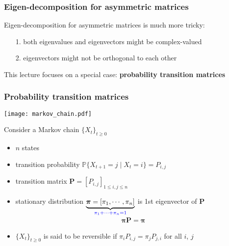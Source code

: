 \documentclass[compress,
mathserif,wide,%
]{beamer}
\begin{document}
\begin{frame}
	\frametitle{Eigen-decomposition for  asymmetric matrices}

	Eigen-decomposition for asymmetric matrices is much more tricky: 
	\begin{itemize}
		\itemsep0.5em
		\item[{\color{black}1.}]  both eigenvalues and eigenvectors might be complex-valued
		\item[{\color{black}2.}]  eigenvectors might not be orthogonal to each other
	\end{itemize}


	\vfill

	This lecture focuses on a special case:  {\bf probability transition matrices}

\end{frame}



\begin{frame}
	\frametitle{Probability transition matrices}

\vspace{-0.5em}
\begin{center}
	\texttt{[image: markov\_chain.pdf]}  
\end{center}

\vspace{-0.5em}
Consider a Markov chain $\{X_t\}_{t\geq 0}$ 

\begin{itemize}
	\itemsep0.5em
	\item $n$ states 
	\item transition probability $\mathbb{P}\{ X_{t+1}=j\mid X_t=i \} = P_{i,j}$
	\item transition matrix $\bm{P}=[P_{i,j}]_{1\leq i,j\leq n}$
	\item stationary distribution $\underset{\textcolor{blue}{ \pi_1+\cdots+\pi_n=1}}{\underbrace{ \bm{\pi}=[\pi_1,\cdots,\pi_n] }}$ is 1st eigenvector of $\bm{P}$
	\begin{align*}
		\bm{\pi} \bm{P} = \bm{\pi}
	\end{align*}
	\item $\{X_t\}_{t\geq 0}$ is said to be \alert{reversible} if $\pi_{i} P_{i,j} = \pi_{j} P_{j,i}$ for all $i$, $j$
\end{itemize}

\end{frame}
\end{document}
